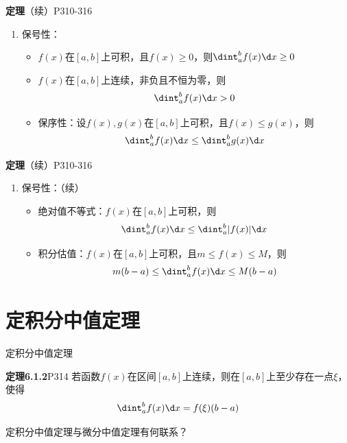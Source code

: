 \begin{frame}
	\linespread{1.2}
	\begin{block}{{\bf 定理}（续）\hfill P310-316}
		\begin{enumerate}\pause 
		  \addtocounter{enumi}{2}
		  \item {\bb 保号性：}\pause 
		  \begin{itemize}
		    \item $f(x)$在$[a,b]$上可积，且$f(x)\geq 0$，则$\dint_a^bf(x)\d x\geq 0$\pause 
		    \item $f(x)$在$[a,b]$上连续，非负且不恒为零，则$$\dint_a^bf(x)\d x> 0$$\pause 
		    \item {\bb 保序性：}设$f(x),g(x)$在$[a,b]$上可积，且$f(x)\leq g(x)$，则
		    $$\dint_a^bf(x)\d x\leq \dint_a^bg(x)\d x$$
		  \end{itemize}
		\end{enumerate}
	\end{block}
\end{frame}

\begin{frame}
	\linespread{1.2}
	\begin{block}{{\bf 定理}（续）\hfill P310-316}
		\begin{enumerate}
		  \addtocounter{enumi}{2}
		  \item {\bb 保号性：}（续）\pause 
		  \begin{itemize}
		    \item {\bb
		    绝对值不等式：}$f(x)$在$[a,b]$上可积，则$$\dint_a^bf(x)\d x\leq\dint_a^b|f(x)|\d x$$\pause 
		    \item {\bb 积分估值：}$f(x)$在$[a,b]$上可积，且$m\leq f(x)\leq M$，则
		    $$m(b-a)\leq\dint_a^bf(x)\d x\leq M(b-a)$$
		  \end{itemize}
		\end{enumerate}
	\end{block}
\end{frame}

\section{定积分中值定理}

\begin{frame}{定积分中值定理}\pause 
	\linespread{1.2}
	\begin{block}{{\bf 定理6.1.2}\hfill P314}
		若函数$f(x)$在区间$[a,b]$上连续，则在$[a,b]$上至少存在一点$\xi$，使得
		$$\dint_a^bf(x)\d x=f(\xi)(b-a)$$
	\end{block}\pause 
	{} 定积分中值定理与微分中值定理有何联系？
\end{frame}

